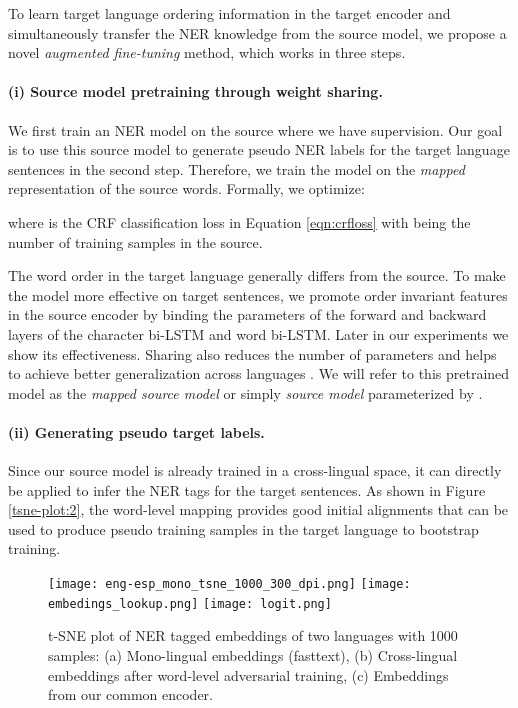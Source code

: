 \documentclass[letterpaper]{article} \usepackage{aaai20}  \usepackage{times}  \usepackage{helvet} \usepackage{courier}  \usepackage[hyphens]{url}  \usepackage{graphicx} \urlstyle{rm} \def\UrlFont{\rm}  \usepackage{graphicx}  \frenchspacing  \setlength{\pdfpagewidth}{8.5in}  \setlength{\pdfpageheight}{11in}
\begin{document}
To learn target language ordering information in the target encoder and simultaneously transfer the NER knowledge from the source model, we propose a novel \emph{augmented fine-tuning} method, which works in three steps. 

\paragraph{(i) Source model pretraining through weight sharing.} We first train an NER model on the source where we have supervision. Our goal is to use this source model to generate pseudo NER labels for the target language sentences in the second step. Therefore, we train the model on the \emph{mapped} representation of the source words. Formally, we optimize: 

\noindent where  is the CRF classification loss in Equation \ref{eqn:crfloss} with  being the number of training samples in the source. 



The word order in the target language generally differs from the source. To make the model more effective on target sentences, we promote order invariant features in the source encoder by binding the parameters of the forward and backward layers of the character bi-LSTM and word bi-LSTM. Later in our experiments we show its effectiveness. Sharing also reduces the number of parameters and helps to achieve better generalization across languages \cite{lample2018phrase}. We will refer to this pretrained model as the \emph{mapped source model} or simply \emph{source model} parameterized by . 

\paragraph{(ii) Generating pseudo target labels.} Since our source model is already trained in a cross-lingual space, it can directly be applied to infer the NER tags for the target sentences. As shown in Figure \ref{tsne-plot:2}, the word-level mapping provides good initial alignments that can be used to produce pseudo training samples in the target language to bootstrap training.   




\begin{figure*}[t!]
  {\texttt{[image: eng-esp\_mono\_tsne\_1000\_300\_dpi.png]}}
  {\texttt{[image: embedings\_lookup.png]}}
  {\texttt{[image: logit.png]}}
  \caption{t-SNE plot of NER tagged embeddings of two languages with 1000 samples: (a) Mono-lingual embeddings (fasttext), (b) Cross-lingual embeddings after word-level adversarial training, (c) Embeddings from our common encoder.}
  \label{fig:tsne}
\end{figure*}
\end{document}
